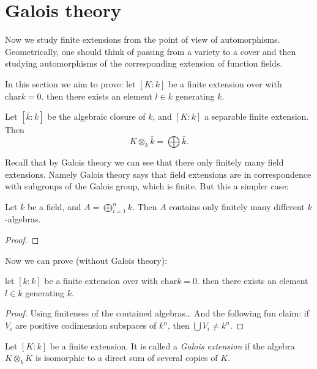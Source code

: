 \section{Galois theory}
\label{section-galois-theory}

\noindent
Now we study finite extensions from the point
of view of automorphisms. Geometrically, one
should think of passing from a variety to a
cover and then studying automorphisms of the
corresponding extension of function fields.

\medskip\noindent
In this section we aim to prove:
let $[K:k]$ be a finite extension over with
$\text{char} k =0$.
then there exists an element $l \in k$
generating $k$.

\begin{theorem}
\label{theorem-separ-exten-algeb-closu}
Let $[\bar{k}:k]$ be the algebraic closure of
$k$,
and $[K:k]$ a separable finite extension.
Then
$$
K \otimes_k \bar{k} = \bigoplus \bar{k}.
$$
\end{theorem}

\noindent
Recall that by Galois theory we can see
that there only finitely many field
extensions.
Namely Galois theory says that field
extensions
are in correspondence with subgroups of the
Galois group, which is finite.
But this a simpler case:

\begin{lemma}
\label{lemma-finitely-many-k-algebras}
Let $k$ be a field,
and $A = \bigoplus_{i=1}^nk$. Then $A$
contains
only finitely many different $k$-algebras.
\end{lemma}

\begin{proof}

\end{proof}

\noindent
Now we can prove (without Galois theory):

\begin{theorem}
\label{theorem-finit-exten-char-0-gener}
let $[k:k]$ be a finite extension over with
$\text{char} k =0$.
then there exists an element $l \in k$
generating $k$.
\end{theorem}

\begin{proof}
Using finiteness of the contained algebras…
And the following fun claim:
if $V_i$ are positive codimension subspaces
of $k^n$,
then $\bigcup V_i \neq  k^n$.
\end{proof}

\begin{definition}
\label{definition-galois-extension}
Let $[K:k]$ be a finite extension.
It is called a {\it Galois extension} if the
algebra
$K \otimes_k K$ is isomorphic to a direct sum
of several copies of $K$.
\end{definition}

